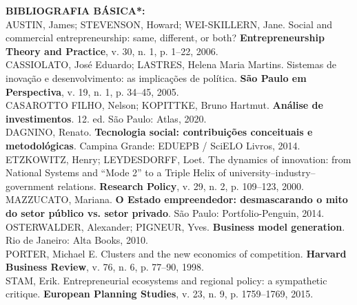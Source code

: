 \documentclass[11pt,a4paper]{article}
\begin{document}
\vspace{8pt}
\small
\begin{flushleft}
\noindent\textbf{BIBLIOGRAFIA BÁSICA*:}\\[4pt]
AUSTIN, James; STEVENSON, Howard; WEI-SKILLERN, Jane. Social and commercial entrepreneurship: same, different, or both? \textbf{Entrepreneurship Theory and Practice}, v. 30, n. 1, p. 1--22, 2006.\\[3pt]
CASSIOLATO, José Eduardo; LASTRES, Helena Maria Martins. Sistemas de inovação e desenvolvimento: as implicações de política. \textbf{São Paulo em Perspectiva}, v. 19, n. 1, p. 34--45, 2005.\\[3pt]
CASAROTTO FILHO, Nelson; KOPITTKE, Bruno Hartmut. \textbf{Análise de investimentos}. 12. ed. São Paulo: Atlas, 2020.\\[3pt]
DAGNINO, Renato. \textbf{Tecnologia social: contribuições conceituais e metodológicas}. Campina Grande: EDUEPB / SciELO Livros, 2014.\\[3pt]
ETZKOWITZ, Henry; LEYDESDORFF, Loet. The dynamics of innovation: from National Systems and ``Mode 2'' to a Triple Helix of university--industry--government relations. \textbf{Research Policy}, v. 29, n. 2, p. 109--123, 2000.\\[3pt]
MAZZUCATO, Mariana. \textbf{O Estado empreendedor: desmascarando o mito do setor público vs. setor privado}. São Paulo: Portfolio-Penguin, 2014.\\[3pt]
OSTERWALDER, Alexander; PIGNEUR, Yves. \textbf{Business model generation}. Rio de Janeiro: Alta Books, 2010.\\[3pt]
PORTER, Michael E. Clusters and the new economics of competition. \textbf{Harvard Business Review}, v. 76, n. 6, p. 77--90, 1998.\\[3pt]
STAM, Erik. Entrepreneurial ecosystems and regional policy: a sympathetic critique. \textbf{European Planning Studies}, v. 23, n. 9, p. 1759--1769, 2015.\\[8pt]


\end{flushleft}
\end{document}
